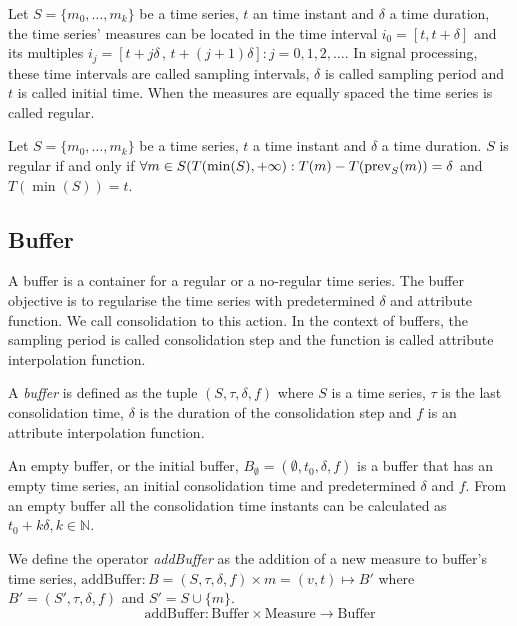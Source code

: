 
Let $S=\{m_0,\ldots,m_k\}$ be a time series, $t$ an time instant and
$\delta$ a time duration, the time series' measures can be located in
the time interval $i_0=[t,t+\delta]$ and its multiples $i_j=[t+j\delta
\,,\, t+(j+1)\delta]: j=0,1,2,\ldots$. In signal processing, these
time intervals are called sampling intervals, $\delta$ is called
sampling period and $t$ is called initial time. When the measures are
equally spaced the time series is called regular.

\begin{definition}
  Let $S=\{m_0,\ldots,m_k\}$ be a time series, $t$ a time instant
  and $\delta$ a time duration. $S$ is regular if and
  only if $\forall m \in S(T(\min(S),+\infty):T(m) - T(\operatorname*{prev}_S(m)) =
  \delta$ and $T(\min(S))=t$.
\end{definition}




\subsection{Buffer}\label{sec:model:buffer}

A buffer is a container for a regular or a no-regular time series. The
buffer objective is to regularise the time series with predetermined $\delta$ 
and attribute function. We call consolidation to this action. In the context
of buffers, the sampling period is called consolidation step
and the function is called attribute interpolation function.

\begin{definition}[Buffer]
  A \emph{buffer} is defined as the tuple $(S,\tau,\delta,f)$ where
  $S$ is a time series, $\tau$ is the last consolidation time, $\delta$
  is the duration of the consolidation step and $f$ is an
  attribute interpolation function.
\end{definition}

An empty buffer, or the initial buffer, $B_{\emptyset} =
(\emptyset,t_0, \delta, f)$ is a buffer that has an empty time
series, an initial consolidation time and predetermined $\delta$ and
$f$. From an empty buffer all the consolidation time instants
can be calculated as $t_0+k\delta, k\in\mathbb{N}$.

We define the operator \emph{addBuffer} as the addition of a new measure to
buffer's time series, $\text{addBuffer}: B = (S,\tau,\delta,f) \times m =
(v,t) \mapsto B'$ where $B'=(S',\tau,\delta,f)$ and $S' = S \cup \{m\} $.
\[
\text{addBuffer}: \text{Buffer} \times \text{Measure} \longrightarrow \text{Buffer}
\]



